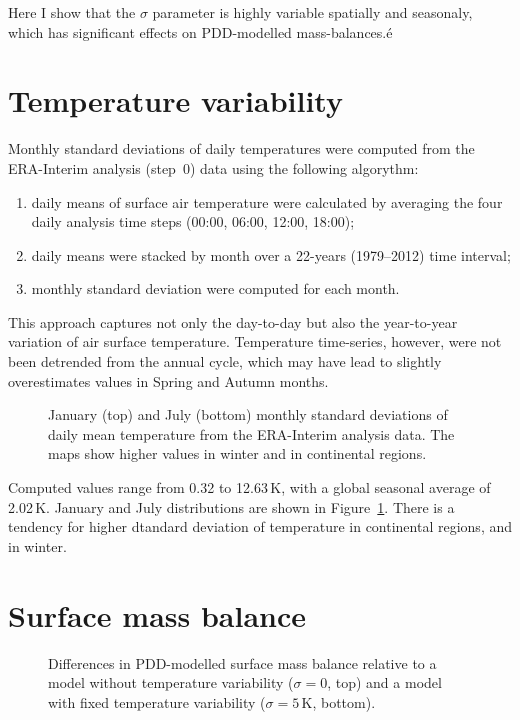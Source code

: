 \documentclass[twocolumn]{igs}
\begin{document}
Here I show that the $\sigma$ parameter is highly variable spatially and seasonaly, which has significant effects on PDD-modelled mass-balances.é

\section{Temperature variability}

Monthly standard deviations of daily temperatures were computed from the ERA-Interim\citep{data:erai} analysis (step~0) data using the following algorythm:

\begin{enumerate}
  \item daily means of surface air temperature were calculated by averaging the four daily analysis time steps (00:00, 06:00, 12:00, 18:00);
  \item daily means were stacked by month over a 22-years (1979--2012) time interval;
  \item monthly standard deviation were computed for each month.
\end{enumerate}

This approach captures not only the day-to-day but also the year-to-year variation of air surface temperature. Temperature time-series, however, were not been detrended from the annual cycle, which may have lead to slightly overestimates values in Spring and Autumn months.

\begin{figure}
  \caption{January (top) and July (bottom) monthly standard deviations of daily mean temperature from the ERA-Interim analysis data. The maps show higher values in winter and in continental regions.}
  \label{fig:stdev}
\end{figure}

Computed values range from 0.32 to 12.63\,K, with a global seasonal average of 2.02\,K. January and July distributions are shown in Figure~\ref{fig:stdev}. There is a tendency for higher dtandard deviation of temperature in continental regions, and in winter.

\section{Surface mass balance}

\begin{figure}
  \caption{Differences in PDD-modelled surface mass balance relative to a model without temperature variability ($\sigma=0$, top) and a model with fixed temperature variability ($\sigma=5\,\mathrm{K}$, bottom).}
  \label{fig:smb}
\end{figure}



\end{document}
